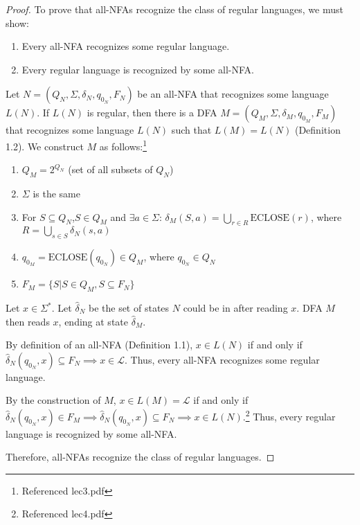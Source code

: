 \documentclass[11pt]{report}
\theoremstyle{definition}
\theoremstyle{plain}
\theoremstyle{plain}
\begin{document}
\begin{proof}
To prove that all-NFAs recognize the class of regular languages, we must show:
\begin{enumerate}
\item Every all-NFA recognizes some regular language.
\item Every regular language is recognized by some all-NFA.
\end{enumerate}

\noindent Let $N=(Q_{N},\Sigma,\delta_{N},q_{0_{N}},F_{N})$ be an all-NFA that recognizes some language $L(N)$. 
If $L(N)$ is regular, then there is a DFA $M=(Q_{M},\Sigma,\delta_{M},q_{0_{M}},F_{M})$ 
that recognizes some language $L(N)$ such that $L(M)=L(N)$ (Definition 1.2). 
We construct $M$ as follows:\footnote{Referenced lec3.pdf}

\begin{enumerate}
\item $Q_{M} = 2^{Q_{N}}$ (set of all subsets of $Q_{N}$)
\item $\Sigma$ is the same
\item For $S \subseteq Q_{N}$,$S \in Q_{M}$ and $\exists a \in \Sigma$: 
$\delta_{M}(S,a)=\underset{r \in R}{\bigcup}\text{ECLOSE}(r)$, where $R=\underset{s \in S}{\bigcup}\delta_{N}(s,a)$
\item $q_{0_{M}}=\text{ECLOSE}(q_{0_{N}})\in Q_{M}$, where $q_{0_{N}} \in Q_{N}$
\item $F_{M}=\{S|S \in Q_{M}, S \subseteq F_{N}\}$
\end{enumerate}

\noindent Let $x \in \Sigma^{*}$. Let $\hat{\delta}_{N}$ be the set of states $N$ could be in after reading $x$. 
DFA $M$ then reads $x$, ending at state $\hat{\delta}_{M}$. \newline

\noindent By definition of an all-NFA (Definition 1.1), 
$x \in L(N)$ if and only if $\hat{\delta}_{N} (q_{0_{N}},x) \subseteq F_{N} \implies x \in \mathcal{L}$.
Thus, every all-NFA recognizes some regular language. \newline

\noindent By the construction of $M$, $x \in L(M) = \mathcal{L}$ if and only if 
$\hat{\delta}_{N} (q_{0_{N}},x) \in F_{M} \implies \hat{\delta}_{N} (q_{0_{N}},x) \subseteq F_{N} \implies x \in L(N)$.\footnote{Referenced lec4.pdf} Thus, every regular language is recognized by some all-NFA. \newline

\noindent Therefore, all-NFAs recognize the class of regular languages.
\end{proof}
\end{document}

